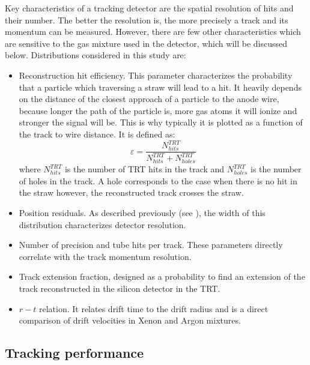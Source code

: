 Key characteristics of a tracking detector are the spatial resolution of hits and their number. 
The better the resolution is, the more precisely a track and its momentum can be measured.
However, there are few other characteristics which are sensitive to the gas mixture used in the detector, which will be discussed below.
Distributions considered in this study are:
\begin{itemize}
 \item Reconstruction hit efficiency. This parameter characterizes the probability that a particle which traversing a straw will lead to a hit.
 It heavily depends on the distance of the closest approach of a particle to the anode wire, because longer the path of the particle is, more gas atoms it will ionize and stronger the signal will be. This is why typically it is plotted as a function of the track to wire distance. It is defined as:
 \begin{equation}
  \varepsilon = \dfrac{N^{TRT}_{hits}}{N^{TRT}_{hits} + N^{TRT}_{holes}}
 \label{eq:hit_eff}
 \end{equation}
 where $N^{TRT}_{hits}$ is the number of TRT hits in the track and $N^{TRT}_{holes}$ is the number of holes in the track. A hole corresponds to the case when there is no hit in the straw
 however, the reconstructed track crosses the straw.
 \item Position residuals. As described previously (see ), the width of this distribution characterizes detector resolution.
 \item Number of precision and tube hits per track. These parameters directly correlate with the track momentum resolution.
 \item Track extension fraction, designed as a probability to find an extension of the track reconstructed in the silicon detector in the TRT.
 \item $r-t$ relation. It relates drift time to the drift radius and is a direct comparison of drift velocities in Xenon and Argon mixtures.
\end{itemize}


\subsection{Tracking performance}
\label{subsec:TRT:trackPerf}

